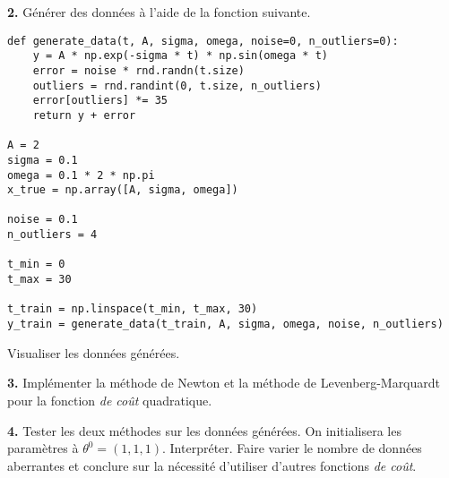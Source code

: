 \documentclass[a4paper,french,12pt]{article}
\begin{document}
\textbf{2.} Générer des données à l'aide de la fonction suivante.
\begin{lstlisting}
def generate_data(t, A, sigma, omega, noise=0, n_outliers=0):
    y = A * np.exp(-sigma * t) * np.sin(omega * t)
    error = noise * rnd.randn(t.size)
    outliers = rnd.randint(0, t.size, n_outliers)
    error[outliers] *= 35
    return y + error
    
A = 2
sigma = 0.1
omega = 0.1 * 2 * np.pi
x_true = np.array([A, sigma, omega])

noise = 0.1
n_outliers = 4

t_min = 0
t_max = 30

t_train = np.linspace(t_min, t_max, 30)
y_train = generate_data(t_train, A, sigma, omega, noise, n_outliers)
  \end{lstlisting}
Visualiser les données générées.

\textbf{3.} Implémenter la méthode de Newton et la méthode de Levenberg-Marquardt pour la fonction \textit{de coût} quadratique.

\textbf{4.} Tester les deux méthodes sur les données générées. On initialisera les paramètres à $\theta^0 = (1,1,1)$. Interpréter. Faire varier le nombre de données aberrantes et conclure sur la nécessité d'utiliser d'autres fonctions \textit{de coût}.

\end{document}
